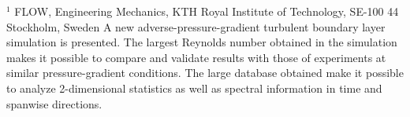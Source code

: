 %
%
%
%
%
%
%
\paperaffiliation
{%
  $^1$ FLOW, Engineering Mechanics, KTH Royal Institute of Technology, SE-100 44 Stockholm, Sweden
}%
%
%
%
%
%
%
%
%
%
%
%
\papersummary%
{%
	A new adverse-pressure-gradient turbulent boundary layer simulation is presented.
	The largest Reynolds number obtained in the simulation makes it possible to compare and validate results with those of experiments at similar pressure-gradient conditions.
	The large database obtained make it possible to analyze 2-dimensional statistics as
	well as spectral information in time and spanwise directions.
}%
%
\graphicspath{{paper1/figs}}%
%
%
%
